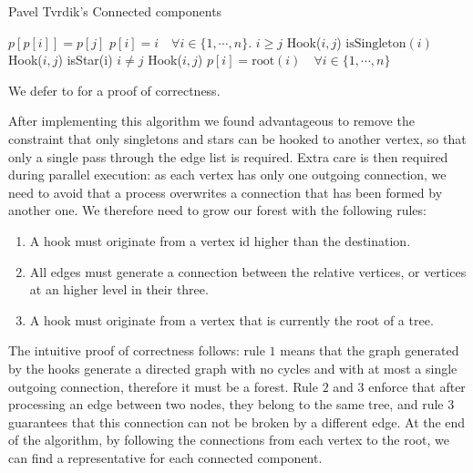 \begin{algorithm}[H]
    \caption{Pavel Tvrdik's Connected components}
    \label{algorithm:cc1}
    \begin{algorithmic}[1]
          \State $p[p[i]] = p[j]$
        \EndProcedure
          \State $p[i] = i \quad \forall i \in \{1,\cdots, n\}$. 
         
          \State  \kif $i\ge j$ \kthen Hook($i, j$)
          \State  \kif $\text{isSingleton}(i)$ \kthen Hook($i, j$)
        \EndFor
         
          \State  \kif isStar(i) \kand $i \neq j$ \kthen Hook($i, j$)
        \EndFor
        \State $p[i] = \text{root}(i) \quad \forall i \in \{1,\cdots, n\}$ 
        \EndWhile
        \EndProcedure
   \end{algorithmic}
\end{algorithm}
We defer to \cite{PCompClass} for a proof of correctness.

After implementing this algorithm we found advantageous to remove the constraint
that only singletons and stars can be hooked to another vertex, so that only a single pass through
the edge list is required. Extra care is then required during parallel execution: as each vertex has only one outgoing
connection, we need to avoid that a process overwrites a connection that has been formed by another one.
We therefore need to grow our forest with the following rules:

\begin{enumerate}
    \item A hook must originate from a vertex id higher than the destination.
    \item All edges must generate a connection between the relative vertices, or vertices at an higher level in their three.
    \item A hook must originate from a vertex that is currently the root of a tree.
\end{enumerate}

The intuitive proof of correctness follows: rule $1$ means that the graph generated by the
hooks generate a directed graph with no cycles and with at most a single outgoing connection, therefore it must be a forest.
Rule $2$ and $3$ enforce that after processing an edge between two nodes,
they belong to the same tree, and rule $3$ guarantees that this connection can not be broken by a different edge.
At the end of the algorithm, by following the connections from each vertex to the root, we can find a representative for each connected component.


